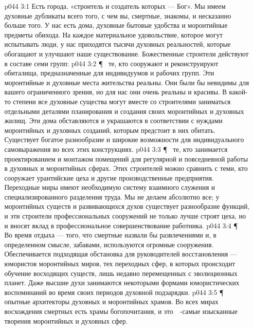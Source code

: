 \vs p044 3:1 Есть города, «строитель и создатель которых --- Бог». Мы имеем духовные дубликаты всего того, с чем вы, смертные, знакомы, и несказанно больше того. У нас есть дома, духовные бытовые удобства и моронтийные предметы обихода. На каждое материальное удовольствие, которое могут испытывать люди, у нас приходятся тысячи духовных реальностей, которые обогащают и улучшают наше существование. Божественные строители действуют в составе семи групп:
\vs p044 3:2 \P\ \bibnobreakspace {} те, кто сооружают и реконструируют обиталища, предназначенные для индивидуумов и рабочих групп. Эти моронтийные и духовные места жительства реальны. Они были бы невидимы для вашего ограниченного зрения, но для нас они очень реальны и красивы. В какой\hyp{}то степени все духовные существа могут вместе со строителями заниматься отдельными деталями планирования и создания своих моронтийных и духовных жилищ. Эти дома обставляются и украшаются в соответствии с нуждами моронтийных и духовных созданий, которым предстоит в них обитать. Существует богатое разнообразие и широкие возможности для индивидуального самовыражения во всех этих конструкциях.
\vs p044 3:3 \P\ \bibnobreakspace {} те, кто занимается проектированием и монтажом помещений для регулярной и повседневной работы в духовных и моронтийных сферах. Этих строителей можно сравнить с теми, кто сооружает урантийские цеха и другие производственные предприятия. Переходные миры имеют необходимую систему взаимного служения и специализированного разделения труда. Мы не делаем абсолютно все; у моронтийных существ и развивающихся духов существует разнообразие функций, и эти строители профессиональных сооружений не только лучше строят цеха, но и вносят вклад в профессиональное совершенствование работника.
\vs p044 3:4 \P\ \bibnobreakspace {} Во время отдыха --- того, что смертные назвали бы развлечениями и, в определенном смысле, забавами, используются огромные сооружения. Обеспечивается подходящая обстановка для руководителей восстановления --- юмористов моронтийных миров, тех переходных сфер, в которых происходит обучение восходящих существ, лишь недавно перемещенных с эволюционных планет. Даже высшие духи занимаются некоторыми формами юмористических воспоминаний во время своих периодов духовной подзарядки.
\vs p044 3:5 \P\ \bibnobreakspace {} опытные архитекторы духовных и моронтийных храмов. Во всех мирах восхождения смертных есть храмы богопочитания, и это　\hyp{}самые изысканные творения моронтийных и духовных сфер.
